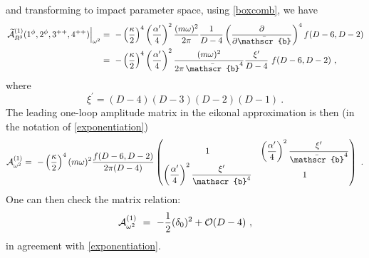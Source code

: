 \documentclass[a4paper,11pt]{article}
\numberwithin{equation}{section}
\begin{document}
and transforming to impact parameter space, using \eqref{boxcomb}, we have 
\begin{align}
\begin{split}
\left.\widetilde{\mathcal{A}}_{R^3}^{(1)} (1^\phi, 2^\phi, 3^{++}, 4^{++})\right|_{\omega^2}&  = \ - \left({  \kappa\over 2} \right)^4 \left({  \alpha^\prime \over 4} \right)^2 {(m \omega)^2 \over 2 \pi} {1\over D-4} \left( {\partial \over \partial \bar{\mathscr{b}}}\right)^4 f(D-6, D-2)\\
&  = \ - \left({  \kappa\over 2} \right)^4 \left({  \alpha^\prime \over 4} \right)^2 {(m \omega)^2 \over 2 \pi\, \bar{\mathscr{b}}^4}
\frac{\xi^\prime}{D-4}\ f(D-6, D-2)
\ ,
\end{split}
\end{align}
where
\begin{equation}
    \xi^\prime = (D-4)(D-3) (D-2) (D-1) \ .
\end{equation}
The leading  one-loop amplitude matrix in the eikonal approximation is then (in the notation of \eqref{exponentiation})
\begin{align}
\mathcal{A}^{(1)}_{\omega^2}  = \ - \left({\kappa\over 2}\right)^4 
( m \omega)^2 {f (D-6, D-2) \over  2 \pi (D-4)}
\begin{pmatrix}1& \left(\dfrac{\alpha^\prime}{4}\right)^2  \dfrac{\xi^\prime}{\bar{\mathscr{b}}^4}\\
 \left(\dfrac{\alpha^\prime}{4}\right)^2  \dfrac{\xi^\prime}{\mathscr{b}^4} & 1 
 \end{pmatrix}
 \ .
\end{align}
One can then check the matrix relation: 
\begin{align}
\mathcal{A}^{(1)}_{\omega^2} \ = \ - {1\over 2} (\mathcal{\delta}_0)^2 + \mathcal{O}(D-4)
\ , 
\end{align}
in agreement with \eqref{exponentiation}. 
\end{document}
